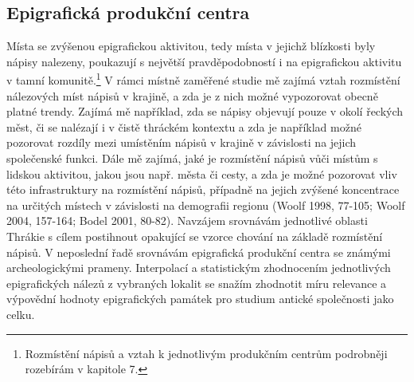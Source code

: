 
\subsection[epigrafická-produkční-centra]{Epigrafická produkční centra}

Místa se zvýšenou epigrafickou aktivitou, tedy místa v jejichž blízkosti byly nápisy nalezeny, poukazují s největší pravděpodobností i na epigrafickou aktivitu v tamní komunitě.\footnote{Rozmístění nápisů a vztah k jednotlivým produkčním centrům podrobněji rozebírám v kapitole 7.} V rámci místně zaměřené studie mě zajímá vztah rozmístění nálezových míst nápisů v krajině, a zda je z nich možné vypozorovat obecně platné trendy. Zajímá mě například, zda se nápisy objevují pouze v okolí řeckých měst, či se nalézají i v čistě thráckém kontextu a zda je například možné pozorovat rozdíly mezi umístěním nápisů v krajině v závislosti na jejich společenské funkci. Dále mě zajímá, jaké je rozmístění nápisů vůči místům s lidskou aktivitou, jakou jsou např. města či cesty, a zda je možné pozorovat vliv této infrastruktury na rozmístění nápisů, případně na jejich zvýšené koncentrace na určitých místech v závislosti na demografii regionu (Woolf 1998, 77-105; Woolf 2004, 157-164; Bodel 2001, 80-82). Navzájem srovnávám jednotlivé oblasti Thrákie s cílem postihnout opakující se vzorce chování na základě rozmístění nápisů. V neposlední řadě srovnávám epigrafická produkční centra se známými archeologickými prameny. Interpolací a statistickým zhodnocením jednotlivých epigrafických nálezů z vybraných lokalit se snažím zhodnotit míru relevance a výpovědní hodnoty epigrafických památek pro studium antické společnosti jako celku.

